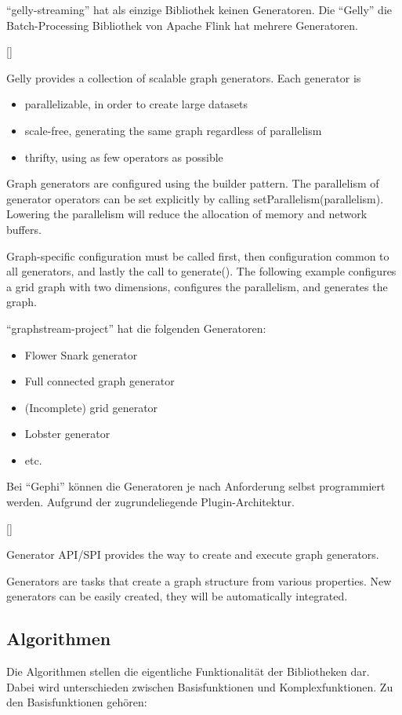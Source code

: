 \enquote{gelly-streaming} hat als einzige Bibliothek keinen Generatoren.
Die \enquote{Gelly} die Batch-Processing Bibliothek von Apache Flink hat mehrere
Generatoren.

[\cite{Foundation2018}]{
Gelly provides a collection of scalable graph generators. Each generator is

\begin{itemize}
    \item parallelizable, in order to create large datasets
    \item scale-free, generating the same graph regardless of parallelism
    \item thrifty, using as few operators as possible
\end{itemize}

Graph generators are configured using the builder pattern. The parallelism of
generator operators can be set explicitly by calling setParallelism(parallelism).
Lowering the parallelism will reduce the allocation of memory and network buffers.

Graph-specific configuration must be called first, then configuration common to
all generators, and lastly the call to generate(). The following example
configures a grid graph with two dimensions, configures the parallelism, and
generates the graph.
}

\enquote{graphstream-project} hat die folgenden Generatoren:

\begin{itemize}
    \item Flower Snark generator
    \item Full connected graph generator
    \item (Incomplete) grid generator
    \item Lobster generator
    \item etc.
\end{itemize}

Bei \enquote{Gephi} können die Generatoren je nach Anforderung selbst
programmiert werden. Aufgrund der zugrundeliegende Plugin-Architektur.

[\cite{Bastian2009}]{
Generator API/SPI provides the way to create and execute graph generators.

Generators are tasks that create a graph structure from various properties.
New generators can be easily created, they will be automatically integrated.
}

\subsection{Algorithmen}
Die Algorithmen stellen die eigentliche Funktionalität der Bibliotheken dar.
Dabei wird unterschieden zwischen Basisfunktionen und Komplexfunktionen.
Zu den Basisfunktionen gehören:

